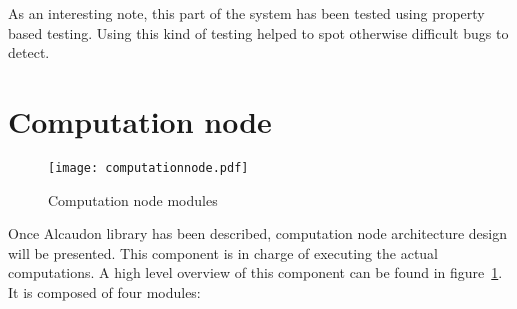 As an interesting note, this part of the system has been tested using property
based testing\cite{quickcheck}. Using this kind of testing helped to spot
otherwise difficult bugs to detect.

\section{Computation node}

\begin{figure}[!h]
  \centering
  \texttt{[image: computationnode.pdf]}
  \caption{Computation node modules}
  \label{fig:computationnode}
\end{figure}

Once Alcaudon library has been described, computation node architecture design
will be presented. This component is in charge of executing the actual
computations. A high level overview of this component can be found in
figure~\ref{fig:computationnode}. It is composed of four modules:
